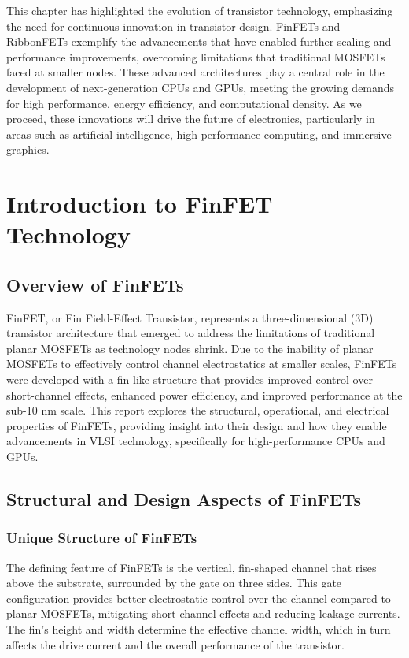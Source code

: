 \documentclass[12pt]{report}
\begin{document}
\begin{titlepage}
This chapter has highlighted the evolution of transistor technology, emphasizing the need for continuous innovation in transistor design. FinFETs and RibbonFETs exemplify the advancements that have enabled further scaling and performance improvements, overcoming limitations that traditional MOSFETs faced at smaller nodes. These advanced architectures play a central role in the development of next-generation CPUs and GPUs, meeting the growing demands for high performance, energy efficiency, and computational density. As we proceed, these innovations will drive the future of electronics, particularly in areas such as artificial intelligence, high-performance computing, and immersive graphics.











\chapter{Introduction to FinFET Technology}
\section{Overview of FinFETs}
FinFET, or Fin Field-Effect Transistor, represents a three-dimensional (3D) transistor architecture that emerged to address the limitations of traditional planar MOSFETs as technology nodes shrink. Due to the inability of planar MOSFETs to effectively control channel electrostatics at smaller scales, FinFETs were developed with a fin-like structure that provides improved control over short-channel effects, enhanced power efficiency, and improved performance at the sub-10 nm scale. This report explores the structural, operational, and electrical properties of FinFETs, providing insight into their design and how they enable advancements in VLSI technology, specifically for high-performance CPUs and GPUs.

\section{Structural and Design Aspects of FinFETs}
\subsection{Unique Structure of FinFETs}
The defining feature of FinFETs is the vertical, fin-shaped channel that rises above the substrate, surrounded by the gate on three sides. This gate configuration provides better electrostatic control over the channel compared to planar MOSFETs, mitigating short-channel effects and reducing leakage currents. The fin's height and width determine the effective channel width, which in turn affects the drive current and the overall performance of the transistor.


\end{titlepage}
\end{document}
